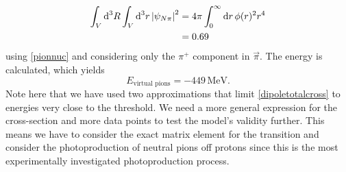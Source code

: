 \begin{align}
	\int_V \text{d}^3R \int_V \text{d}^3 r \, \abs{\psi_{N\pi}}^2 &= 4\pi \int_0^\infty \text{d}r \, \phi(r)^2r^4\\
	&= 0.69
\end{align}
using \eqref{pionnuc} and considering only the $\pi^+$ component in $\vec{\pi}$. The energy is calculated, which yields
\begin{equation}
	E_{\text{virtual pions}} = -449 \, \text{MeV}.
\end{equation}
Note here that we have used two approximations that limit \eqref{dipoletotalcross} to energies very close to the threshold. We need a more general expression for the cross-section and more data points to test the model's validity further. This means we have to consider the exact matrix element for the transition and consider the photoproduction of neutral pions off protons since this is the most experimentally investigated photoproduction process. 
